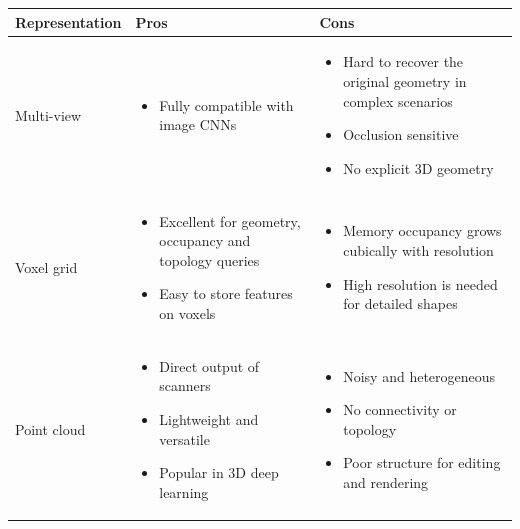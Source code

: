 \begin{table}[ht]
\centering
\renewcommand{\arraystretch}{1.1}

\begin{tabularx}{\textwidth}{|p{2.5cm}|X|X|}\hline
\textbf{Representation} & \textbf{Pros} & \textbf{Cons} \\
\hline

Multi-view &
\begin{itemize}[leftmargin=*,nosep]
    \item Fully compatible with image CNNs
\end{itemize}
&
\begin{itemize}[leftmargin=*,nosep]
    \item Hard to recover the original geometry in complex scenarios
    \item Occlusion sensitive
    \item No explicit 3D geometry
\end{itemize}
\\
\hline

Voxel grid &
\begin{itemize}[leftmargin=*,nosep]
    \item Excellent for geometry, occupancy and topology queries
    \item Easy to store features on voxels
\end{itemize}
&
\begin{itemize}[leftmargin=*,nosep]
    \item Memory occupancy grows cubically with resolution
    \item High resolution is needed for detailed shapes
\end{itemize}
\\
\hline

Point cloud &
\begin{itemize}[leftmargin=*,nosep]
    \item Direct output of scanners
    \item Lightweight and versatile
    \item Popular in 3D deep learning
\end{itemize}
&
\begin{itemize}[leftmargin=*,nosep]
    \item Noisy and heterogeneous
    \item No connectivity or topology
    \item Poor structure for editing and rendering
\end{itemize}
\\
\hline


\end{tabularx}
\end{table}
